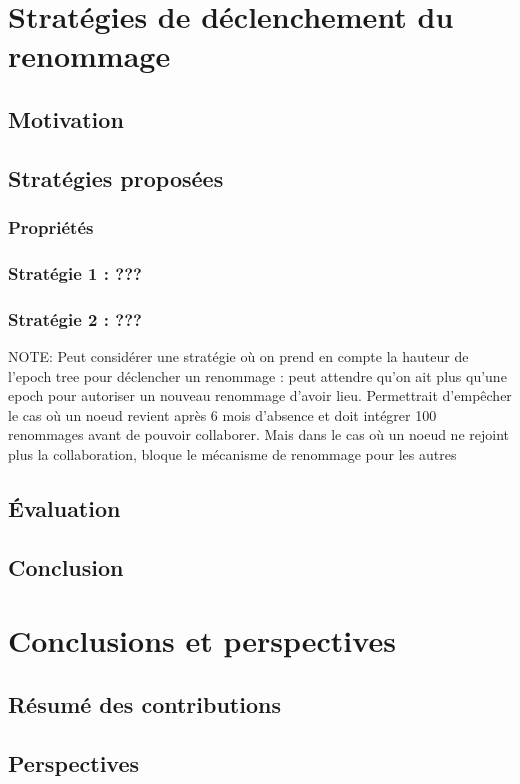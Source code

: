 \documentclass[12pt]{thesul}
\begin{document}
\chapter{Stratégies de déclenchement du renommage}
\minitoc
\section{Motivation}
\section{Stratégies proposées}
\subsection{Propriétés}
\subsection{Stratégie 1 : ???}
\subsection{Stratégie 2 : ???}

NOTE: Peut considérer une stratégie où on prend en compte la hauteur de l'epoch tree pour déclencher un renommage : peut attendre qu'on ait plus qu'une epoch pour autoriser un nouveau renommage d'avoir lieu.
Permettrait d'empêcher le cas où un noeud revient après 6 mois d'absence et doit intégrer 100 renommages avant de pouvoir collaborer.
Mais dans le cas où un noeud ne rejoint plus la collaboration, bloque le mécanisme de renommage pour les autres

\section{Évaluation}
\section{Conclusion}
% 

\NumberThisInToc
\chapter{Conclusions et perspectives}
\minitoc
\section{Résumé des contributions}
\section{Perspectives}
\end{document}
